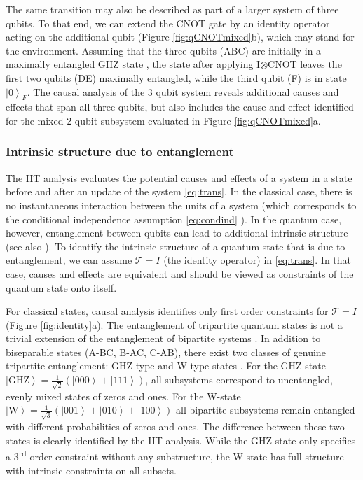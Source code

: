 \documentclass[preprints, article, accept, pdftex, moreauthors, letterpaper]{Definitions/mdpi}
\newcommand{\ket}[1]{\left| #1 \right>} %
\renewcommand{\=}[1]{\stackrel{#1}{=}} %
\newcommand{\T}{\mathcal{T}} %
\renewcommand{\*}{\otimes}%
\begin{document}
The same transition may also be described as part of a larger system of three qubits. To that end, we can extend the CNOT gate by an identity operator acting on the additional qubit (Figure \ref{fig:qCNOTmixed}b), which may stand for the environment.
Assuming that the three qubits (ABC) are initially in a maximally entangled GHZ state \cite{Greenberger1989}, the state after applying I$\otimes$CNOT leaves the first two qubits (DE) maximally entangled, while the third qubit (F) is in state $\ket{0}_F$. The causal analysis of the 3 qubit system reveals additional causes and effects that span all three qubits, but also includes the cause and effect identified for the mixed 2 qubit subsystem evaluated in Figure \ref{fig:qCNOTmixed}a.





\subsubsection{Intrinsic structure due to entanglement}

The IIT analysis evaluates the potential causes and effects of a system in a state before and after an update of the system \eqref{eq:trans}. In the classical case, there is no instantaneous interaction between the units of a system (which corresponds to the conditional independence assumption \eqref{eq:condind} \cite{Albantakis2019}). In the quantum case, however, entanglement between qubits can lead to additional intrinsic structure (see also \cite{Kremnizer2015}). To identify the intrinsic structure of a quantum state that is due to entanglement, we can assume $\T = I$ (the identity operator) in \eqref{eq:trans}.
In that case, causes and effects are equivalent and should be viewed as constraints of the quantum state onto itself.

For classical states, causal analysis identifies only first order constraints for $\T = I$ (Figure \ref{fig:identity}a).
The entanglement of tripartite quantum states is not a trivial extension of the entanglement of bipartite systems \cite{Acin2001}. In addition to biseparable states (A-BC, B-AC, C-AB), there exist two classes of genuine tripartite entanglement: GHZ-type and W-type states \cite{Dur2000}. For the GHZ-state $\ket{\text{GHZ}} = \frac{1}{\sqrt{2}}(\ket{000}+\ket{111})$, all subsystems correspond to unentangled, evenly mixed states of zeros and ones.
For the W-state $\ket{\text{W}} = \frac{1}{\sqrt{3}}(\ket{001}+\ket{010}+\ket{100})$ all bipartite subsystems remain entangled with different probabilities of zeros and ones. The difference between these two states is clearly identified by the IIT analysis. While the GHZ-state only specifies a 3\textsuperscript{rd} order constraint without any substructure, the W-state has full structure with intrinsic constraints on all subsets.
\end{document}
